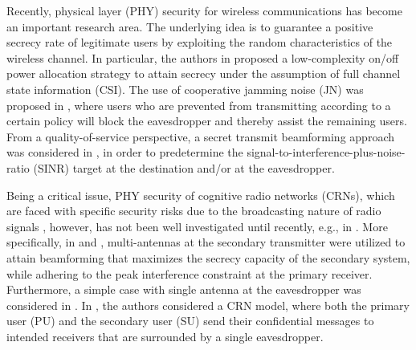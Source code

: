 \documentclass[journal,twoside]{IEEEtran}
\begin{document}
Recently,  physical  layer (PHY) security for wireless communications has become  an important research area. The underlying idea is to guarantee a positive secrecy rate of legitimate users by exploiting the random characteristics of the wireless channel. In particular,  the authors in  \cite{Gopala} proposed a low-complexity on/off power allocation strategy to attain secrecy  under the assumption of full channel state information (CSI). The use of cooperative jamming noise (JN) was proposed in  \cite{Tekin}, where users who are prevented from transmitting according to a certain policy will block the eavesdropper and thereby assist the remaining users. From a  quality-of-service perspective, a secret transmit beamforming approach  was considered in  \cite{Mukherjee_1}, in order to predetermine the signal-to-interference-plus-noise-ratio (SINR) target at the destination and/or at the eavesdropper.

Being a critical issue, PHY security of cognitive radio networks (CRNs), which are faced with specific security risks due to the broadcasting nature of  radio signals \cite{Nguyen:COMML16,Yeoh:TVT15,Lui:TCOM16}, however,  has not been well investigated until  recently, e.g., in  \cite{Nguyen:TIFS:16,Pei,Nguyen,Nguyen_15,Zhu:VT:15}. More specifically, in \cite{Nguyen:TIFS:16} and \cite{Pei}, multi-antennas at the secondary transmitter  were utilized to attain  beamforming that maximizes the secrecy capacity of the secondary system,  while adhering to the peak interference constraint at the primary receiver.  Furthermore, a simple case with  single antenna at the eavesdropper was considered in \cite{Nguyen}.  In \cite{Zhu:VT:15}, the authors considered a CRN model, where both the primary user (PU) and the secondary user (SU) send their confidential messages to intended receivers that are surrounded by a single eavesdropper.  
\end{document}

